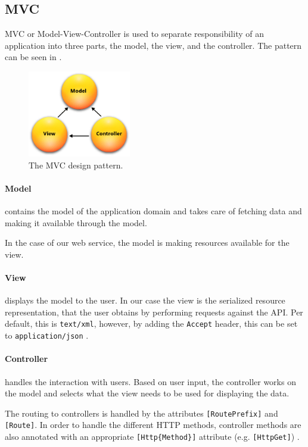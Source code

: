 \subsection{MVC} 
MVC or Model-View-Controller\cite{aspmvc} is used to separate responsibility of an application into three parts, the model, the view, and the controller.
The pattern can be seen in .

\begin{figure}[h]
\center
\includegraphics[width=0.4\textwidth]{graphics/mvc}
\caption{The MVC design pattern\cite{aspmvc}.}
\label{mvcdiagram}
\end{figure}

\paragraph{Model} contains the model of the application domain and takes care of fetching data and making it available through the model.

In the case of our web service, the model is making resources available for the view.

\paragraph{View} displays the model to the user.
In our case the view is the serialized resource representation, that the user obtains by performing requests against the API.
Per default, this is \texttt{text/xml}, however, by adding the \texttt{Accept} header, this can be set to \texttt{application/json} \cite[Section 14]{http_specification}.

\paragraph{Controller} handles the interaction with users.
Based on user input, the controller works on the model and selects what the view needs to be used for displaying the data.

The routing to controllers is handled by the attributes \texttt{[RoutePrefix]} and \texttt{[Route]}.
In order to handle the different HTTP methods, controller methods are also annotated with an appropriate \texttt{[Http\{Method\}]} attribute (e.g. \texttt{[HttpGet]}) \cite{asp_routing}.